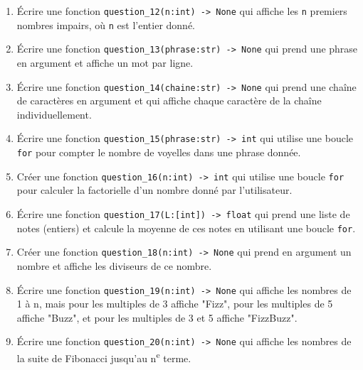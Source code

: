 \begin{enumerate}
    \item Écrire une fonction \lstinline{question_12(n:int) -> None} qui affiche les \lstinline{n} premiers nombres impairs, où \lstinline{n} est l'entier donné.

    \item Écrire une fonction \lstinline{question_13(phrase:str) -> None} qui prend une phrase en argument et affiche un mot par ligne.

    \item Écrire une fonction \lstinline{question_14(chaine:str) -> None} qui prend une chaîne de caractères en argument et qui affiche chaque caractère de la chaîne individuellement.

    \item Écrire une fonction \lstinline{question_15(phrase:str) -> int} qui utilise une boucle \lstinline{for} pour compter le nombre de voyelles dans une phrase donnée.

    \item Créer une fonction \lstinline{question_16(n:int) -> int} qui utilise une boucle \lstinline{for} pour calculer la factorielle d'un nombre donné par l'utilisateur.

    \item Écrire une fonction \lstinline{question_17(L:[int]) -> float} qui prend une liste de notes (entiers) et calcule la moyenne de ces notes en utilisant une boucle \lstinline{for}.

    \item Créer une fonction \lstinline{question_18(n:int) -> None} qui prend en argument un nombre et affiche les diviseurs de ce nombre.

    \item Écrire une fonction \lstinline{question_19(n:int) -> None} qui affiche les nombres de 1 à n, mais pour les multiples de 3 affiche "Fizz", pour les multiples de 5 affiche "Buzz", et pour les multiples de 3 et 5 affiche "FizzBuzz".

    \item Écrire une fonction \lstinline{question_20(n:int) -> None} qui affiche les nombres de la suite de Fibonacci jusqu'au n\textsuperscript{e} terme.

\end{enumerate}

